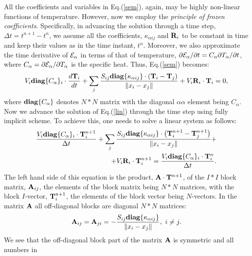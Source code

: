 \documentclass[12pt]{revtex4}
\begin{document}
All the coefficients and variables in Eq.(\ref{sem}), again, may be highly non-linear 
functions of 
temperature. However, now we employ the {\it principle 
of frozen coefficients}. Specifically, in advancing the solution 
through a time %
step, 
$\Delta t=t^{n+1}-t^n$, we assume all the coefficients, 
$\kappa_{\alpha ij}$ and ${\bf R}_i$ to be constant in time and keep their values as 
in the time instant, $t^n$. Moreover, we
also approximate the time derivative of ${\cal E}_\alpha$ in terms of that of 
temperature, 
$\partial{\cal E}_\alpha/\partial t = C_\alpha \partial T_\alpha/\partial t$, where 
$C_\alpha=\partial {\cal E}_\alpha/\partial T_\alpha$ is the specific heat. Thus, 
Eq.(\ref{sem}) becomes:
\begin{equation}\label{lin}
V_i{\bf diag}\{C_\alpha\}_i\cdot\frac{d{\bf T}_i}{d t} +\sum_j{\frac{S_{ij}
{\bf diag}\{\kappa_{\alpha ij}\}\cdot
\left({\bf T}_i-{\bf T}_j\right)}{\|x_i-x_j\|}}+V_i{\bf R}_i\cdot {\bf T}_i=0,
\end{equation}
where ${\bf diag}\{C_\alpha\}$ denotes $N*N$ matrix with the diagonal 
$\alpha\alpha$ element being  $C_\alpha$. %
Now we advance the solution of Eq.(\ref{lin}) through the time step using fully 
implicit scheme. To achieve this, one needs to solve a linear system as follows:
\begin{eqnarray}
\frac{V_i{\bf diag}\{C_\alpha\}_i
\cdot{\bf T}^{n+1}_i}{\Delta t}+\sum_j{\frac{S_{ij}
{\bf diag}\{\kappa_{\alpha ij}\}\cdot
\left({\bf T}^{n+1}_i-{\bf T}^{n+1}_j\right)}{\|x_i-x_j\|}}+\nonumber\\
+V_i{\bf R}_i\cdot {\bf T}^{n+1}_i
=\frac{V_i{\bf diag}\{C_\alpha\}_i\cdot{\bf T}^{n}_i}{\Delta t}.\label{alg}
\end{eqnarray}
The left hand side of this equation is the product, ${\bf A}\cdot{\bf T}^{n+1}$, of the $I*I$ block matrix, 
${\bf A}_{ij}$, the elements of the block matrix being $N*N$ matrices, with the block $I$-vector, 
${\bf T}^{n+1}_i$, the elements of the block vector being $N$-vectors. In the matrix ${\bf A}$ all 
off-diagonal blocks are diagonal $N*N$ matrices: 
\begin{equation}
{\bf A}_{ij}={\bf A}_{ji}=-\frac{S_{ij}
{\bf diag}\{\kappa_{\alpha ij}\}}{\|x_i-x_j\|},\,\,i\ne j.
\end{equation}
We see that the off-diagonal block part of the matrix ${\bf A}$ is symmetric and all numbers in 
\end{document}
